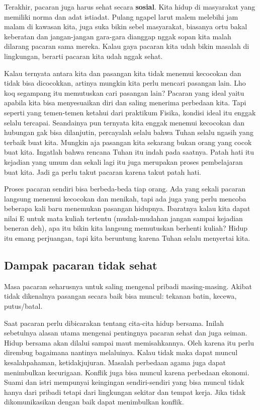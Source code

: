\documentclass[a4paper,11pt,openany]{article}
\begin{document}
Terakhir, pacaran juga harus sehat secara \textbf{sosial}. Kita hidup di masyarakat yang memiliki norma dan adat istiadat. Pulang ngapel larut malem melebihi jam malam di kawasan kita, juga suka bikin sebel masyarakat, biasanya ortu bakal keberatan dan jangan-jangan gara-gara dianggap nggak sopan kita malah dilarang pacaran sama mereka. Kalau gaya pacaran kita udah bikin masalah di lingkungan, berarti pacaran kita udah nggak sehat.

Kalau ternyata antara kita dan pasangan kita tidak menemui kecocokan dan tidak bisa dicocokkan, artinya mungkin kita perlu mencari pasangan lain. Lho koq segampang itu memutuskan cari pasangan lain? Pacaran yang ideal yaitu apabila kita bisa menyesuaikan diri dan saling menerima perbedaan kita. Tapi seperti yang temen-temen ketahui dari praktikum Fisika, kondisi ideal itu enggak selalu tercapai. Seandainya pun ternyata kita enggak menemui kecocokan dan hubungan gak bisa dilanjutin, percayalah selalu bahwa Tuhan selalu ngasih yang terbaik buat kita. Mungkin aja pasangan kita sekarang bukan orang yang cocok buat kita. Ingatlah bahwa rencana Tuhan itu indah pada saatnya. Patah hati itu kejadian yang umum dan sekali lagi itu juga merupakan proses pembelajaran buat kita. Jadi ga perlu takut pacaran karena takut patah hati.

Proses pacaran sendiri bisa berbeda-beda tiap orang. Ada yang sekali pacaran langsung menemui kecocokan dan menikah, tapi ada juga yang perlu mencoba beberapa kali baru menemukan pasangan hidupnya. Ibaratnya kalau kita dapat nilai E untuk mata kuliah tertentu (mudah-mudahan jangan sampai kejadian beneran deh), apa itu bikin kita langsung memutuskan berhenti kuliah? Hidup itu emang perjuangan, tapi kita beruntung karena Tuhan selalu menyertai kita.


\subsection*{Dampak pacaran tidak sehat}

Masa pacaran seharusnya untuk saling mengenal pribadi masing-masing. Akibat tidak dikenalnya pasangan secara baik bisa muncul:
tekanan batin, kecewa, putus/batal.

Saat pacaran perlu dibicarakan tentang cita-cita hidup bersama. Inilah sebetulnya alasan utama mengenai pentingnya pacaran sehat dan juga seiman. Hidup bersama akan dilalui sampai maut memisahkannya. Oleh karena itu perlu dirembug bagaimana nantinya melaluinya. Kalau tidak maka dapat muncul kesalahpahaman, ketidakjujuran. Masalah perbedaan agama juga dapat menimbulkan kecurigaan. Konflik juga bisa muncul karena perbedaan ekonomi. Suami dan istri mempunyai keingingan sendiri-sendiri yang bisa muncul tidak hanya dari pribadi tetapi dari lingkungan sekitar dan tempat kerja. Jika tidak dikomunikasikan dengan baik dapat menimbulkan konflik. \cite{iman1996}
\end{document}
